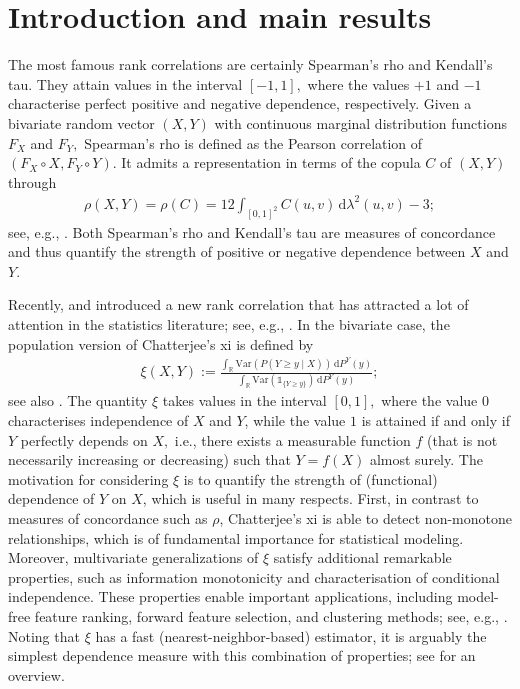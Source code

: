 \documentclass{article}
\theoremstyle{plain}
\theoremstyle{definition}
\def\1{\mathds{1}} %
\newcommand{\de}{\mathrm{\,d}}
\newcommand{\Var}{\mathrm{Var}}
\begin{document}
\section{Introduction and main results}\label{sec1}

The most famous rank correlations are certainly Spearman's rho and Kendall's tau. They attain values in the interval \([-1,1],\) where the values \(+1\) and \(-1\) characterise perfect positive and negative dependence, respectively. 
Given a bivariate random vector \((X,Y)\) with continuous marginal distribution functions \(F_X\) and \(F_Y,\) Spearman's rho is defined as the Pearson correlation of \((F_X\circ X,F_Y \circ Y).\) 
It admits a representation in terms of the copula \(C\) of \((X,Y)\) through
\begin{align}\label{frm_rho_integral}
    \rho(X,Y)=\rho(C) = 12 \int_{[0,1]^2} C(u,v) \de \lambda^2(u,v) - 3;
\end{align}
see, e.g., \cite[Theorem~5.1.6]{Nelsen-2006}.
Both Spearman's rho and Kendall's tau are measures of concordance and thus quantify the strength of positive or negative dependence between \(X\) and \(Y.\) 

Recently, \citet{chatterjee2020} and \citet{chatterjee2021} introduced a new rank correlation that has attracted a lot of attention in the statistics literature; see, e.g., \cite{auddy2021,bickel2022,bickel2020,bernoulli2021,fan2022A,deb2020b,han2022limit,shi2021,Strothmann-2022,wiesel2022}.  
In the bivariate case, the population version of Chatterjee's xi is defined by
\begin{align}\label{eqchatt}
    \xi(X,Y) := \frac{\int_{\mathbb{R}} \Var(P(Y\geq y\mid X)) \de P^Y(y) }{\int_{\mathbb{R}} \Var(\1_{\{Y\geq y\}}) \de P^Y(y)};
\end{align}
see also \cite{Gamboa-Klein-Lagnoux-2018}.
The quantity \(\xi\) takes values in the interval \([0,1],\) where the value \(0\) characterises independence of \(X\) and \(Y\), while the value \(1\) is attained if and only if \(Y\) perfectly depends on \(X,\) i.e., there exists a measurable function \(f\) (that is not necessarily increasing or decreasing) such that \(Y = f(X)\) almost surely.
The motivation for considering \(\xi\) is to quantify the strength of (functional) dependence of \(Y\) on \(X\), which is useful in many respects.
First, in contrast to measures of concordance such as \(\rho\), Chatterjee’s xi is able to detect non-monotone relationships, which is of fundamental importance for statistical modeling.
Moreover, multivariate generalizations of \(\xi\) satisfy additional remarkable properties, such as information monotonicity and characterisation of conditional independence.
These properties enable important applications, including model-free feature ranking, forward feature selection, and clustering methods; see, e.g., \cite{chatterjee2021,Ansari-Fuchs-2022,Fuchs-Wang-2024,deb2020b}.
Noting that \(\xi\) has a fast (nearest-neighbor-based) estimator, it is arguably the simplest dependence measure with this combination of properties; see \cite{Chatterjee-2024} for an overview.
\end{document}
